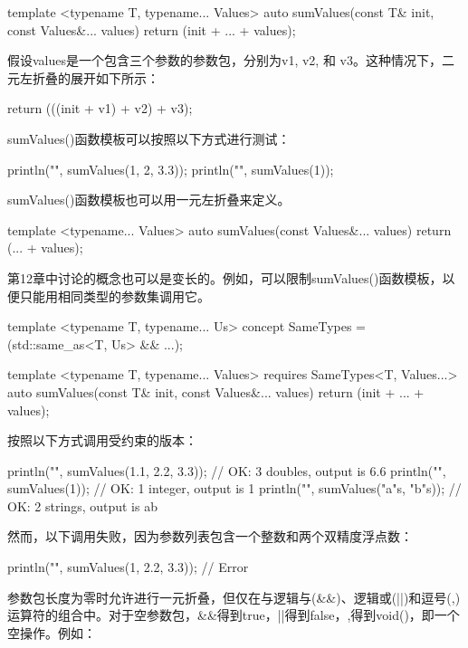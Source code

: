\begin{cpp}
template <typename T, typename... Values>
auto sumValues(const T& init, const Values&... values)
{ return (init + ... + values);}
\end{cpp}

假设values是一个包含三个参数的参数包，分别为v1, v2, 和 v3。这种情况下，二元左折叠的展开如下所示：

\begin{cpp}
return (((init + v1) + v2) + v3);
\end{cpp}

sumValues()函数模板可以按照以下方式进行测试：

\begin{cpp}
println("{}", sumValues(1, 2, 3.3));
println("{}", sumValues(1));
\end{cpp}

sumValues()函数模板也可以用一元左折叠来定义。

\begin{cpp}
template <typename... Values>
auto sumValues(const Values&... values) { return (... + values); }
\end{cpp}

第12章中讨论的概念也可以是变长的。例如，可以限制sumValues()函数模板，以便只能用相同类型的参数集调用它。

\begin{cpp}
template <typename T, typename... Us>
concept SameTypes = (std::same_as<T, Us> && ...);

template <typename T, typename... Values>
    requires SameTypes<T, Values...>
auto sumValues(const T& init, const Values&... values)
{ return (init + ... + values); }
\end{cpp}

按照以下方式调用受约束的版本：

\begin{cpp}
println("{}", sumValues(1.1, 2.2, 3.3)); // OK: 3 doubles, output is 6.6
println("{}", sumValues(1)); // OK: 1 integer, output is 1
println("{}", sumValues("a"s, "b"s)); // OK: 2 strings, output is ab
\end{cpp}

然而，以下调用失败，因为参数列表包含一个整数和两个双精度浮点数：

\begin{cpp}
println("{}", sumValues(1, 2.2, 3.3)); // Error
\end{cpp}

参数包长度为零时允许进行一元折叠，但仅在与逻辑与(\&\&)、逻辑或(||)和逗号(,)运算符的组合中。对于空参数包，\&\&得到true，||得到false，,得到void()，即一个空操作。例如：

